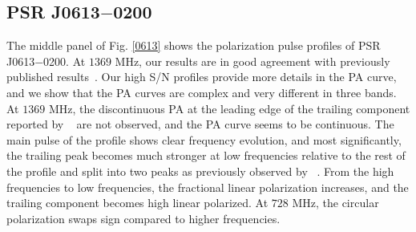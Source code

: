 \documentclass[useAMS,usenatbib]{mn2e}
\begin{document}
\subsection{PSR J0613$-$0200}

The middle panel of Fig. \ref{0613} shows the polarization pulse profiles of 
PSR J0613$-$0200.
%
At $1369$ MHz, our results are in good agreement with previously published
results~\citep{Ord04,Yan11}. 
%
Our high S/N profiles provide more details in the PA curve, and we show that 
the PA curves are complex and very different in three bands. 
%
At $1369$ MHz, the discontinuous PA at the leading edge of the trailing 
component reported by ~\citet{Yan11} are not observed, and the PA curve seems 
to be continuous.
%
The main pulse of the profile shows clear frequency evolution, and most 
significantly, the trailing peak becomes much stronger at low frequencies 
relative to the rest of the profile and split into two peaks as previously
observed by ~\citet{Stairs99}.
%
From the high frequencies to low frequencies, the fractional linear 
polarization increases, and the trailing component becomes high linear 
polarized. 
%
At $728$ MHz, the circular polarization swaps sign compared to higher 
frequencies.
%
\end{document}
